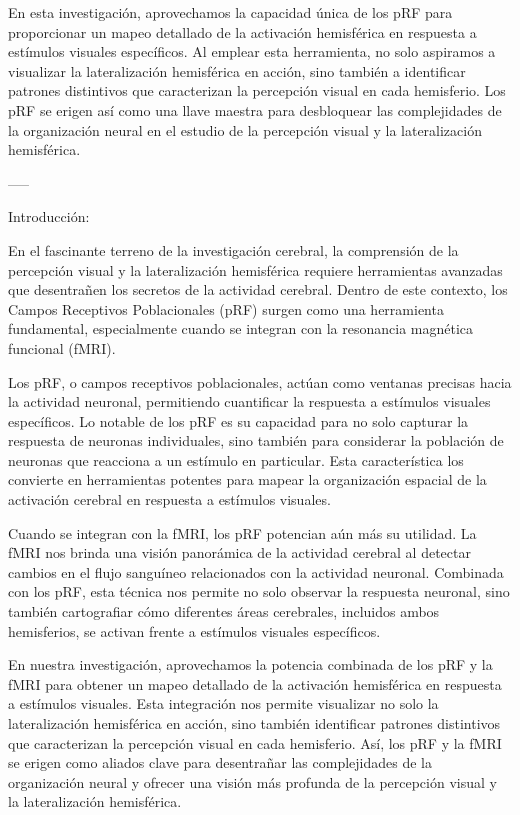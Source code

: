 \documentclass[12pt,oneside]{uhthesis}
\begin{document}
En esta investigación, aprovechamos la capacidad única de los pRF para proporcionar un mapeo detallado de la activación hemisférica en respuesta a estímulos visuales específicos. Al emplear esta herramienta, no solo aspiramos a visualizar la lateralización hemisférica en acción, sino también a identificar patrones distintivos que caracterizan la percepción visual en cada hemisferio. Los pRF se erigen así como una llave maestra para desbloquear las complejidades de la organización neural en el estudio de la percepción visual y la lateralización hemisférica.

-----

Introducción:

En el fascinante terreno de la investigación cerebral, la comprensión de la percepción visual y la lateralización hemisférica requiere herramientas avanzadas que desentrañen los secretos de la actividad cerebral. Dentro de este contexto, los Campos Receptivos Poblacionales (pRF) surgen como una herramienta fundamental, especialmente cuando se integran con la resonancia magnética funcional (fMRI).

Los pRF, o campos receptivos poblacionales, actúan como ventanas precisas hacia la actividad neuronal, permitiendo cuantificar la respuesta a estímulos visuales específicos. Lo notable de los pRF es su capacidad para no solo capturar la respuesta de neuronas individuales, sino también para considerar la población de neuronas que reacciona a un estímulo en particular. Esta característica los convierte en herramientas potentes para mapear la organización espacial de la activación cerebral en respuesta a estímulos visuales.

Cuando se integran con la fMRI, los pRF potencian aún más su utilidad. La fMRI nos brinda una visión panorámica de la actividad cerebral al detectar cambios en el flujo sanguíneo relacionados con la actividad neuronal. Combinada con los pRF, esta técnica nos permite no solo observar la respuesta neuronal, sino también cartografiar cómo diferentes áreas cerebrales, incluidos ambos hemisferios, se activan frente a estímulos visuales específicos.

En nuestra investigación, aprovechamos la potencia combinada de los pRF y la fMRI para obtener un mapeo detallado de la activación hemisférica en respuesta a estímulos visuales. Esta integración nos permite visualizar no solo la lateralización hemisférica en acción, sino también identificar patrones distintivos que caracterizan la percepción visual en cada hemisferio. Así, los pRF y la fMRI se erigen como aliados clave para desentrañar las complejidades de la organización neural y ofrecer una visión más profunda de la percepción visual y la lateralización hemisférica.
\end{document}
